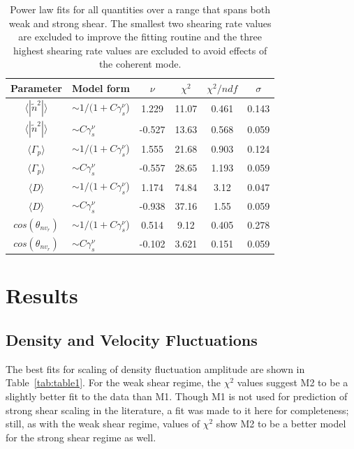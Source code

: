 \documentclass[aip,pop,amsmath,amssymb,peprint,superscriptaddress]{revtex4-1} %
\begin{document}
\begin{table}
\caption{\label{tab:table7}Power law fits for all quantities over a
  range that spans both weak and strong shear. The smallest two
  shearing rate values are excluded to improve the fitting routine and
  the three highest shearing rate values are excluded to avoid effects of the coherent mode.}
\begin{ruledtabular}
\begin{tabular}{clcccc}
Parameter&Model form&$\nu$&$\chi^2$&$\chi^2/ndf$&$\sigma$\\
\hline
$\langle |\tilde{n}^{2}|\rangle$     & $\sim 1/(1+C\gamma_{s}^\nu$) &1.229    &11.07     &0.461   &0.143\\
$\langle |\tilde{n}^{2}|\rangle$     & $\sim C\gamma_{s}^\nu$       &-0.527   &13.63     &0.568   &0.059\\
$\langle \Gamma_{p}\rangle$          & $\sim 1/(1+C\gamma_{s}^\nu$) &1.555    &21.68     &0.903   &0.124\\
$\langle \Gamma_{p}\rangle$          & $\sim C\gamma_{s}^\nu$       &-0.557   &28.65     &1.193   &0.059\\
$\langle D\rangle$                   & $\sim 1/(1+C\gamma_{s}^\nu$) &1.174    &74.84     &3.12    &0.047\\
$\langle D\rangle$                   & $\sim C\gamma_{s}^\nu$       &-0.938   &37.16     &1.55    &0.059\\
$cos(\theta_{nv_{r}})$               & $\sim 1/(1+C\gamma_{s}^\nu$) &0.514    &9.12      &0.405   &0.278\\
$cos(\theta_{nv_{r}})$               & $\sim C\gamma_{s}^\nu$       &-0.102   &3.621     &0.151   &0.059\\

\end{tabular}
\end{ruledtabular}
\end{table}

\section{Results}

\subsection{Density and Velocity Fluctuations}

The best fits for scaling of density fluctuation amplitude are shown in Table~\ref{tab:table1}. For the weak shear regime, the $\chi^{2}$ values suggest M2 to be a slightly better fit to the data than M1. Though M1 is not used for prediction of strong shear scaling in the literature, a fit was made to it here for completeness; still, as with the weak shear regime, values of $\chi^{2}$ show M2 to be a better model for the strong shear regime as well.
\end{document}
